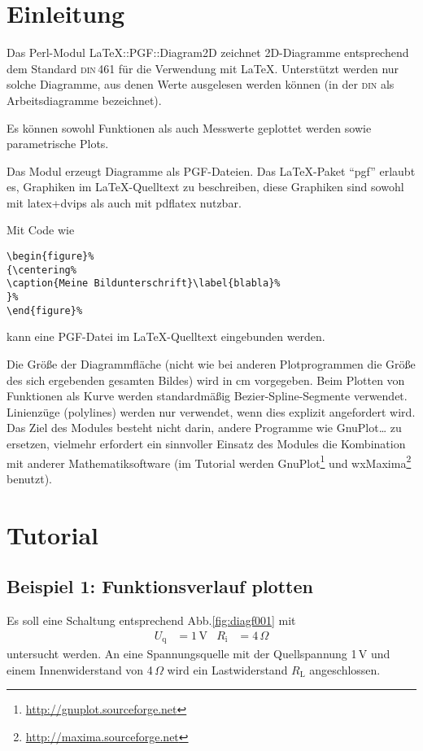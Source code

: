\documentclass[ngerman,origlongtable]{scrartcl}
\author{Dipl.-Ing.~D.~Krause}
\title{\resizebox{10cm}{!}{LaTeX::PGF::Diagram2D}}
\begin{document}
\startofdocument
\section{Einleitung}
Das Perl-Modul LaTeX::PGF::Diagram2D zeichnet 2D-Diagramme entsprechend dem
Standard \textsc{din}\,461 für die Verwendung mit \LaTeX{}.
Unterstützt werden nur solche Diagramme, aus denen
Werte ausgelesen werden können (in der \textsc{din} als Arbeitsdiagramme
bezeichnet).

Es können sowohl Funktionen als auch Messwerte geplottet werden
sowie parametrische Plots.

Das Modul erzeugt Diagramme als PGF-Dateien. Das \LaTeX{}-Paket
"`pgf"' erlaubt es, Graphiken im \LaTeX-Quelltext zu beschreiben,
diese Graphiken sind sowohl mit latex+dvips als auch mit pdflatex nutzbar.

Mit Code wie
\begin{lstlisting}
\begin{figure}%
{\centering%
\caption{Meine Bildunterschrift}\label{blabla}%
}%
\end{figure}%
\end{lstlisting}
kann eine PGF-Datei im \LaTeX-Quelltext eingebunden werden.

Die Größe der Diagrammfläche (nicht wie bei anderen Plotprogrammen
die Größe des sich ergebenden gesamten Bildes) wird in cm vorgegeben.
Beim Plotten von Funktionen als Kurve werden standardmäßig
Bezier-Spline-Segmente
verwendet. Linienzüge (polylines) werden nur verwendet, wenn dies explizit
angefordert wird.\\
Das Ziel des Modules besteht nicht darin, andere Programme wie
GnuPlot\ldots{} zu ersetzen, vielmehr erfordert ein sinnvoller Einsatz
des Modules die Kombination mit anderer Mathematiksoftware (im Tutorial
werden GnuPlot\footnote{\url{http://gnuplot.sourceforge.net}}
und wxMaxima\footnote{\url{http://maxima.sourceforge.net}}
benutzt).


\clearpage
\section{Tutorial}
\subsection[Funktion]{Beispiel 1: Funktionsverlauf plotten}
Es soll eine Schaltung entsprechend Abb.\vref{fig:diagf001} mit
\begin{align*}U_{\text{q}}&=1\,\text{V}&R_{\text{i}}&=4\,\Omega\end{align*}
untersucht werden. An eine Spannungsquelle mit der Quellspannung
1\,V und einem Innenwiderstand von 4\,\(\Omega\) wird ein Lastwiderstand
\(R_{\text{L}}\) angeschlossen.
\end{document}
